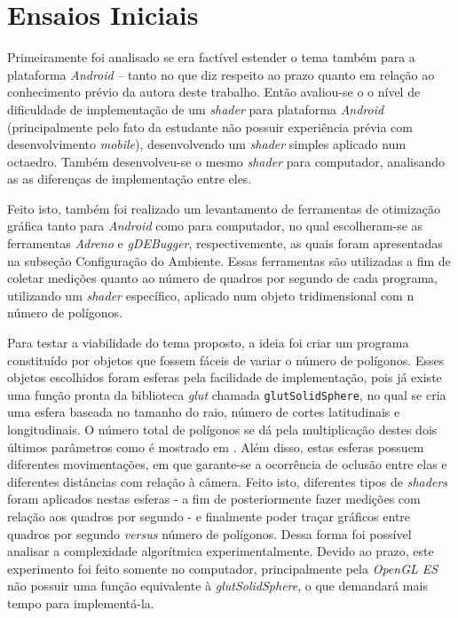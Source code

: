 \section{Ensaios Iniciais}

Primeiramente foi analisado se era factível estender o tema também para a plataforma \textit{Android} -- tanto no que diz respeito ao prazo quanto em relação ao conhecimento prévio da autora deste trabalho. Então avaliou-se o o nível de dificuldade de implementação de um  \textit{shader} para plataforma \textit{Android} (principalmente pelo fato da estudante não possuir experiência prévia com desenvolvimento \textit{mobile}), desenvolvendo um \textit{shader} simples aplicado num octaedro. Também desenvolveu-se o mesmo \textit{shader} para computador, analisando as as diferenças de implementação entre eles.  

Feito isto, também foi realizado um levantamento de ferramentas de otimização gráfica tanto para \textit{Android} como para computador, no qual escolheram-se as ferramentas \textit{Adreno} e \textit{gDEBugger}, respectivemente, as quais foram apresentadas na subseção Configuração do Ambiente. Essas ferramentas são utilizadas a fim de coletar medições quanto ao número de quadros por segundo de cada programa, utilizando um \textit{shader} específico, aplicado num objeto tridimensional com n número de polígonos. 

	Para testar a viabilidade do tema proposto, a ideia foi criar um programa constituído por objetos que fossem fáceis de variar o número de polígonos. Esses objetos escolhidos foram esferas pela facilidade de implementação, pois já existe uma função pronta da biblioteca \textit{glut} chamada \texttt{glutSolidSphere}, no qual se cria uma esfera baseada no tamanho do raio, número de cortes latitudinais e longitudinais. O número total de polígonos se dá pela multiplicação destes dois últimos parâmetros como é mostrado em \cite{poly}.  Além disso, estas esferas possuem diferentes movimentações, em que garante-se a ocorrência de oclusão entre elas e diferentes distâncias com relação à câmera. Feito isto, diferentes tipos de \textit{shaders} foram aplicados nestas esferas - a fim de posteriormente fazer medições com relação aos quadros por segundo - e finalmente poder traçar gráficos entre quadros por segundo \textit{versus} número de polígonos. Dessa forma foi possível analisar a complexidade algorítmica experimentalmente. Devido ao prazo, este experimento foi feito somente no computador, principalmente pela \textit{OpenGL ES} não possuir uma função equivalente à \textit{glutSolidSphere}, o que demandará mais tempo para implementá-la. 

